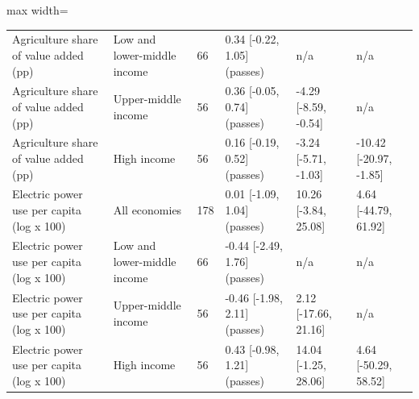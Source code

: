 \begin{table}[!ht]
\begin{adjustbox}{max width=\linewidth}
\begin{tabular}{@{}llllll@{}}
Agriculture share of value added (pp) & Low and lower-middle income & 66 & 0.34 [-0.22, 1.05] (passes) & n/a & n/a \\
Agriculture share of value added (pp) & Upper-middle income & 56 & 0.36 [-0.05, 0.74] (passes) & -4.29 [-8.59, -0.54] & n/a \\
Agriculture share of value added (pp) & High income & 56 & 0.16 [-0.19, 0.52] (passes) & -3.24 [-5.71, -1.03] & -10.42 [-20.97, -1.85] \\
Electric power use per capita (log x 100) & All economies & 178 & 0.01 [-1.09, 1.04] (passes) & 10.26 [-3.84, 25.08] & 4.64 [-44.79, 61.92] \\
Electric power use per capita (log x 100) & Low and lower-middle income & 66 & -0.44 [-2.49, 1.76] (passes) & n/a & n/a \\
Electric power use per capita (log x 100) & Upper-middle income & 56 & -0.46 [-1.98, 2.11] (passes) & 2.12 [-17.66, 21.16] & n/a \\
Electric power use per capita (log x 100) & High income & 56 & 0.43 [-0.98, 1.21] (passes) & 14.04 [-1.25, 28.06] & 4.64 [-50.29, 58.52] \\
\bottomrule\end{tabular}\end{adjustbox}\end{table}
